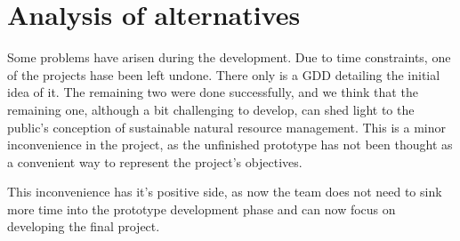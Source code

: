 \chapter{Analysis of alternatives}

Some problems have arisen during the development. Due to time constraints, one of the projects hase been left undone. There only is a GDD detailing the initial idea of it. The remaining two were done successfully, and we think that the remaining one, although a bit challenging to develop, can shed light to the public's conception of sustainable natural resource management. This is a minor inconvenience in the project, as the unfinished prototype has not been thought as a convenient way to represent the project's objectives.

This inconvenience has it's positive side, as now the team does not need to sink more time into the prototype development phase and can now focus on developing the final project.
